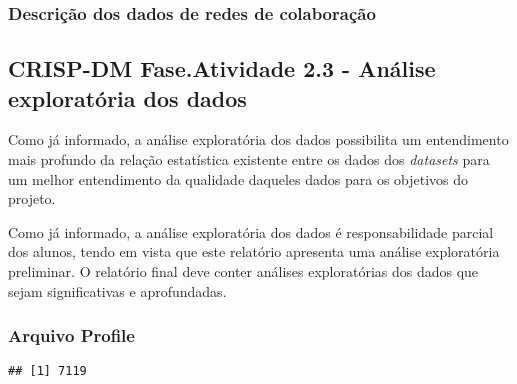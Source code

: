 \documentclass[]{article}
\newenvironment{Shaded}{\begin{snugshade}}{\end{snugshade}}
\newcommand{\KeywordTok}[1]{\textcolor[rgb]{0.13,0.29,0.53}{\textbf{#1}}}
\newcommand{\CommentTok}[1]{\textcolor[rgb]{0.56,0.35,0.01}{\textit{#1}}}
\newcommand{\ControlFlowTok}[1]{\textcolor[rgb]{0.13,0.29,0.53}{\textbf{#1}}}
\newcommand{\OperatorTok}[1]{\textcolor[rgb]{0.81,0.36,0.00}{\textbf{#1}}}
\newcommand{\NormalTok}[1]{#1}
\begin{document}
\subsubsection{Descrição dos dados de redes de
colaboração}\label{descricao-dos-dados-de-redes-de-colaboracao}

\subsection{CRISP-DM Fase.Atividade 2.3 - Análise exploratória dos
dados}\label{crisp-dm-fase.atividade-2.3---analise-exploratoria-dos-dados}

Como já informado, a análise exploratória dos dados possibilita um
entendimento mais profundo da relação estatística existente entre os
dados dos \emph{datasets} para um melhor entendimento da qualidade
daqueles dados para os objetivos do projeto.

Como já informado, a análise exploratória dos dados é responsabilidade
parcial dos alunos, tendo em vista que este relatório apresenta uma
análise exploratória preliminar. O relatório final deve conter análises
exploratórias dos dados que sejam significativas e aprofundadas.

\subsubsection{Arquivo Profile}\label{arquivo-profile}

\begin{Shaded}
\end{Shaded}

\begin{verbatim}
## [1] 7119
\end{verbatim}

\begin{Shaded}
\end{Shaded}
\end{document}
